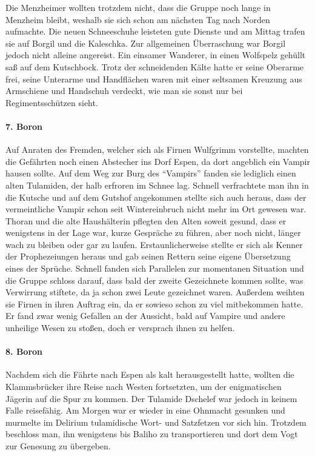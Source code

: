 Die Menzheimer wollten trotzdem nicht, dass die Gruppe noch lange in Menzheim bleibt, weshalb sie sich schon am nächsten Tag nach Norden aufmachte. Die neuen Schneeschuhe leisteten gute Dienste und am Mittag trafen sie auf Borgil und die Kaleschka. Zur allgemeinen Überraschung war Borgil jedoch nicht alleine angereist. Ein einsamer Wanderer, in einen Wolfspelz gehüllt saß auf dem Kutschbock. Trotz der schneidenden Kälte hatte er seine Oberarme frei, seine Unterarme und Handflächen waren mit einer seltsamen Kreuzung aus Armschiene und Handschuh verdeckt, wie man sie sonst nur bei Regimentsschützen sieht.

\paragraph{7. Boron}
Auf Anraten des Fremden, welcher sich als Firnen Wulfgrimm vorstellte, machten die Gefährten noch einen Abstecher ins Dorf Espen, da dort angeblich ein Vampir hausen sollte. Auf dem Weg zur Burg des ``Vampirs'' fanden sie lediglich einen alten Tulamiden, der halb erfroren im Schnee lag. Schnell verfrachtete man ihn in die Kutsche und auf dem Gutshof angekommen stellte sich auch heraus, dass der vermeintliche Vampir schon seit Wintereinbruch nicht mehr im Ort gewesen war. Thoran und die alte Haushälterin pflegten den Alten soweit gesund, dass er wenigstens in der Lage war, kurze Gespräche zu führen, aber noch nicht, länger wach zu bleiben oder gar zu laufen. Erstaunlicherweise stellte er sich als Kenner der Prophezeiungen heraus und gab seinen Rettern seine eigene Übersetzung eines der Sprüche. Schnell fanden sich Parallelen zur momentanen Situation und die Gruppe schloss darauf, dass bald der zweite Gezeichnete kommen sollte, was Verwirrung stiftete, da ja schon zwei Leute gezeichnet waren. Außerdem weihten sie Firnen in ihren Auftrag ein, da er sowieso schon zu viel mitbekommen hatte. Er fand zwar wenig Gefallen an der Aussicht, bald auf Vampire und andere unheilige Wesen zu stoßen, doch er versprach ihnen zu helfen.

\paragraph{8. Boron}
Nachdem sich die Fährte nach Espen als kalt herausgestellt hatte, wollten die Klammsbrücker ihre Reise nach Westen fortsetzten, um der enigmatischen Jägerin auf die Spur zu kommen. Der Tulamide Dschelef war jedoch in keinem Falle reisefähig. Am Morgen war er wieder in eine Ohnmacht gesunken und murmelte im Delirium tulamidische Wort- und Satzfetzen vor sich hin. Trotzdem beschloss man, ihn wenigstens bis Baliho zu transportieren und dort dem Vogt zur Genesung zu übergeben.

